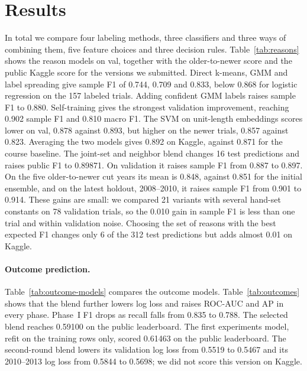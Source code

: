 \documentclass[10pt,twocolumn,letterpaper]{article}
\begin{document}
\section{Results}

In total we compare four labeling methods, three classifiers and three ways of combining them, five feature choices and three decision rules.
Table~\ref{tab:reasons} shows the reason models on val, together with the older-to-newer score and the public Kaggle score for the versions we submitted.
Direct k-means, GMM and label spreading give sample F1 of 0.744, 0.709 and 0.833, below 0.868 for logistic regression on the 157 labeled trials. Adding confident GMM labels raises sample F1 to 0.880. Self-training gives the strongest validation improvement, reaching 0.902 sample F1 and 0.810 macro F1.
The SVM on unit-length embeddings scores lower on val, 0.878 against 0.893, but higher on the newer trials, 0.857 against 0.823.
Averaging the two models gives 0.892 on Kaggle, against 0.871 for the course baseline. The joint-set and neighbor blend changes 16 test predictions and raises public F1 to 0.89871. On validation it raises sample F1 from 0.887 to 0.897. On the five older-to-newer cut years its mean is 0.848, against 0.851 for the initial ensemble, and on the latest holdout, 2008--2010, it raises sample F1 from 0.901 to 0.914.
These gains are small: we compared 21 variants with several hand-set constants on 78 validation trials, so the 0.010 gain in sample F1 is less than one trial and within validation noise.
Choosing the set of reasons with the best expected F1 changes only 6 of the 312 test predictions but adds almost 0.01 on Kaggle.


\paragraph{Outcome prediction.}
Table~\ref{tab:outcome-models} compares the outcome models. Table~\ref{tab:outcomes} shows that the blend further lowers log loss and raises ROC-AUC and AP in every phase. Phase~I F1 drops as recall falls from 0.835 to 0.788. The selected blend reaches 0.59100 on the public leaderboard. The first experiments model, refit on the training rows only, scored 0.61463 on the public leaderboard. The second-round blend lowers its validation log loss from 0.5519 to 0.5467 and its 2010--2013 log loss from 0.5844 to 0.5698; we did not score this version on Kaggle.
\end{document}
